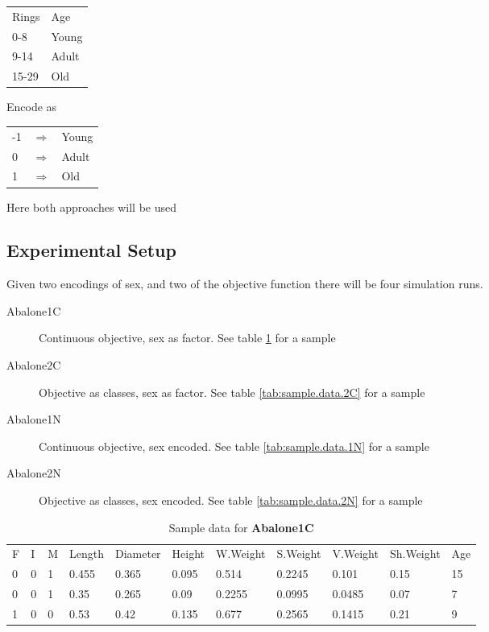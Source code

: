 \documentclass[a4paper,twoside]{article}
\begin{document}
\begin{enumerate}
\begin{tabular}[h]{|ll|}
  \hline
  Rings  &                      Age\\
  0-8    &                    Young\\
  9-14   &                    Adult\\
  15-29  &                    Old \\
  \hline
\end{tabular}

Encode as

\begin{tabular}[h]{lcl}
  -1 &$\Rightarrow$& Young\\
  0 & $\Rightarrow$ & Adult\\
  1 &  $\Rightarrow$  & Old\\
\end{tabular}


Here both approaches will be used


\subsection{Experimental Setup}

Given two encodings of sex, and two of the objective function there
will be four simulation runs.

\begin{description}
\item[Abalone1C] Continuous objective, sex as factor.  See table
  \ref{tab:sample.data.1C} for a sample
\item[Abalone2C]  Objective as classes, sex as factor.  See table
  \ref{tab:sample.data.2C} for a sample
\item[Abalone1N] Continuous objective, sex encoded.  See table
  \ref{tab:sample.data.1N} for a sample
\item[Abalone2N]  Objective as classes, sex encoded.  See table
  \ref{tab:sample.data.2N} for a sample
  
\end{description}

\begin{table}
  \begin{tabular}{lllllllllll}
    F & I & M & Length & Diameter & Height & W.Weight & S.Weight & V.Weight & Sh.Weight & Age \\
    0 & 0 & 1 & 0.455 & 0.365 & 0.095 & 0.514 & 0.2245 & 0.101 & 0.15 & 15 \\
    0 & 0 & 1 & 0.35 & 0.265 & 0.09 & 0.2255 & 0.0995 & 0.0485 & 0.07 & 7 \\
    1 & 0 & 0 & 0.53 & 0.42 & 0.135 & 0.677 & 0.2565 & 0.1415 & 0.21 & 9 \\
  \end{tabular}
  \label{tab:sample.data.1C}
  \caption{Sample data for \textbf{Abalone1C}}
\end{table}



\end{enumerate}
\end{document}

